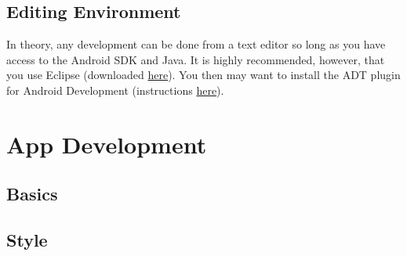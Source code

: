 \documentclass[12pt]{article}
\begin{document}
\subsection{Editing Environment}
In theory, any development can be done from a text editor so long as you have access to the Android SDK and Java.  It is highly recommended, however, that you use Eclipse (downloaded \href{http://www.eclipse.org/downloads/packages/release/helios/sr2}{here}).  You then may want to install the ADT plugin for Android Development (instructions \href{http://developer.android.com/sdk/eclipse-adt.html#installing}{here}).


\section{App Development}

\subsection{Basics}

\subsection{Style}
\end{document}

